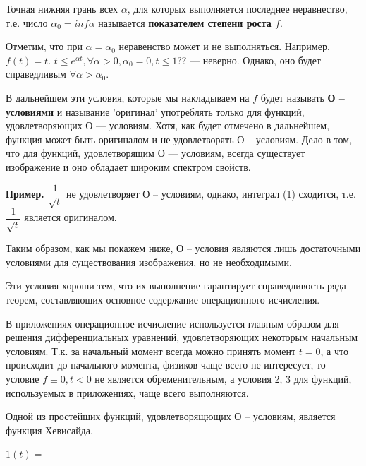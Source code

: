 \documentclass[a4paper, 12pt]{report}
\begin{document}
Точная нижняя грань всех $\alpha$, для которых выполняется последнее неравнество, т.е. число $\alpha_0 = inf{\alpha}$ называется \textbf{показателем степени роста $f$}.
\par\bigskip
Отметим, что при $\alpha = \alpha_0$ неравенство может и не выполняться. Например, $f(t) = t$. $t \leq e^{\alpha t}, \forall \alpha > 0, \alpha_0 = 0, t \leq 1 ??$ --- неверно. Однако, оно будет справедливым $\forall \alpha > \alpha_0$.

\par\bigskip
В дальнейшем эти условия, которые мы накладываем на $f$ будет называть \textbf{О -- условиями} и называние 'оригинал' употреблять только для функций, удовлетворяющих О --- условиям. Хотя, как будет отмечено в дальнейшем, функция может быть оригиналом и не удовлетворять О -- условиям. Дело в том, что для функций, удовлетворящим О --- условиям, всегда существует изображение и оно обладает широким спектром свойств.

\par\bigskip
\textbf{Пример.} \quad $\dfrac{1}{\sqrt{t}}$ не удовлетворяет О -- условиям, однако, интеграл (1) сходится, т.е. $\dfrac{1}{\sqrt{t}}$ является оригиналом.
\par\bigskip
Таким образом, как мы покажем ниже, О -- условия являются лишь достаточными условиями для существования изображения, но не необходимыми.

\par\bigskip

Эти условия хороши тем, что их выполнение гарантирует справедливость ряда теорем, составляющих основное содержание операционного исчисления.

В приложениях операционное исчисление используется главным образом для решения дифференциальных уравнений, удовлетворяющих некоторым начальным условиям. Т.к. за начальный момент всегда можно принять момент $t = 0$, а что происходит до начального момента, физиков чаще всего не интересует, то условие $f \equiv 0, t < 0$ не является обременительным, а условия 2, 3 для функций, используемых в приложениях, чаще всего выполняются.

\par\bigskip
Одной из простейших функций, удовлетворящющих О -- условиям, является функция Хевисайда.

\begin{center}
 $1(t) = $ 
 \begin{cases}
   1, & $t \geq 0$\\
   0 & $t < 0$$}
 \end{cases}
\end{center}
\end{document}
